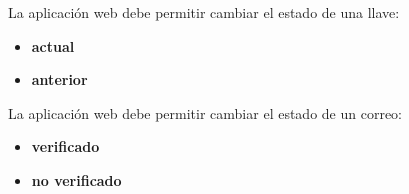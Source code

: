 {
  La aplicación web debe permitir cambiar el estado de una llave:
  \begin{itemize}
    \item \textbf{actual}
    \item \textbf{anterior}
  \end{itemize}
}

{
  La aplicación web debe permitir cambiar el estado de un correo:
  \begin{itemize}
    \item \textbf{verificado}
    \item \textbf{no verificado}
  \end{itemize}
}

